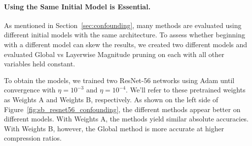 %
%

\vspace{-4mm}
\paragraph{Using the Same Initial Model is Essential.}

As mentioned in Section~\ref{sec:confounding}, many methods are evaluated using different initial models with the same architecture. To assess whether beginning with a different model can skew the results, we created two different models and evaluated Global vs Layerwise Magnitude pruning on each with all other variables held constant.

To obtain the models, we trained two ResNet-56 networks using Adam until convergence with $\eta=10^{-3}$ and $\eta=10^{-4}$.
We'll refer to these pretrained weights as Weights A and Weights B, respectively.
%
As shown on the left side of Figure~\ref{fig:sb_resnet56_confounding}, the different methods appear better on different models. With Weights A, the methods yield similar absolute accuracies. With Weights B, however, the Global method is more accurate at higher compression ratios.

%
%
%

